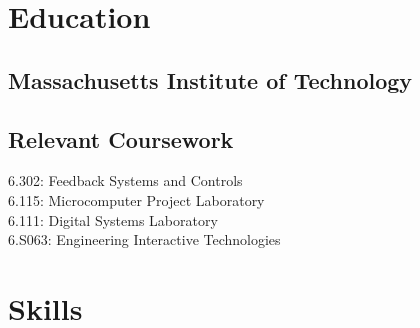 \documentclass[letterpaper, article]{deedy-resume-openfont}
\begin{document}
\hfill
%
%
\begin{minipage}[t]{0.33\textwidth}

\vspace{\topsep}


\section{Education}

\subsection{Massachusetts Institute of Technology \hfill}
\sectionsep

\subsection{Relevant Coursework \hfill}
\vspace{.05cm}
6.302: Feedback Systems and Controls\\
6.115: Microcomputer Project Laboratory \\
6.111: Digital Systems Laboratory \\
6.S063: Engineering Interactive Technologies




\section{Skills}

\end{minipage}
\end{document}
